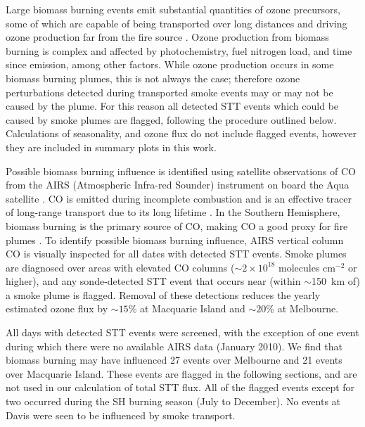     Large biomass burning events emit substantial quantities of ozone precursors, some of which are capable of being transported over long distances and driving ozone production far from the fire source \citep{Jaffe2012}.
    Ozone production from biomass burning is complex and affected by photochemistry, fuel nitrogen load, and time since emission, among other factors. 
    While ozone production occurs in some biomass burning plumes, this is not always the case; therefore ozone perturbations detected during transported smoke events may or may not be caused by the plume.
    For this reason all detected STT events which could be caused by smoke plumes are flagged, following the procedure outlined below.
    Calculations of seasonality, and ozone flux do not include flagged events, however they are included in summary plots in this work.
    
    
    Possible biomass burning influence is identified using satellite observations of CO from the AIRS (Atmospheric Infra-red Sounder) instrument on board the Aqua satellite \citep{AIRS3STD}.
    CO is emitted during incomplete combustion and is an effective tracer of long-range transport due to its long lifetime \citep{Edwards2003, Edwards2006}.
    In the Southern Hemisphere, biomass burning is the primary source of CO, making CO a good proxy for fire plumes \citep[e.g.][]{Sinha2004, Mari2008}.
    To identify possible biomass burning influence, AIRS vertical column CO is visually inspected for all dates with detected STT events.
    Smoke plumes are diagnosed over areas with elevated CO columns ($\sim 2 \times 10^{18}$ molecules cm$^{-2}$ or higher), and any sonde-detected STT event that occurs near (within $\sim$150~km of) a smoke plume is flagged.
    Removal of these detections reduces the yearly estimated ozone flux by $\sim 15\%$ at Macquarie Island and $\sim 20\%$ at Melbourne.
    
    All days with detected STT events were screened, with the exception of one event during which there were no available AIRS data (January 2010).
    We find that biomass burning may have influenced 27 events over Melbourne and 21 events over Macquarie Island.
    These events are flagged in the following sections, and are not used in our calculation of total STT flux.
    All of the flagged events except for two occurred during the SH burning season (July to December). %
    No events at Davis were seen to be influenced by smoke transport.
  
